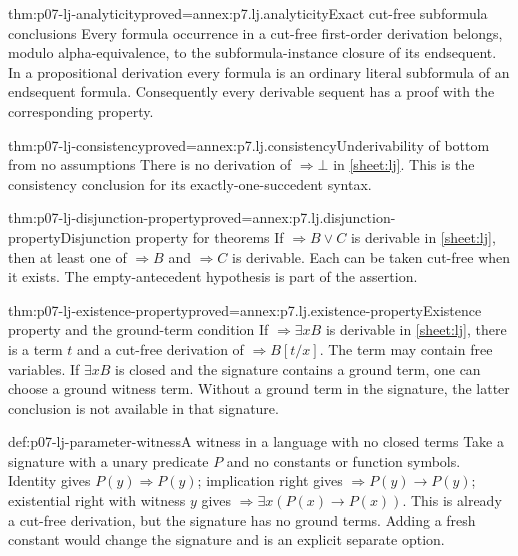 \begin{hbcorollary}{thm:p07-lj-analyticity}{proved=annex:p7.lj.analyticity}{Exact cut-free subformula conclusions}
Every formula occurrence in a cut-free first-order derivation belongs,
modulo alpha-equivalence, to the subformula-instance closure of its
endsequent.  In a propositional derivation every formula is an ordinary
literal subformula of an endsequent formula.  Consequently every
derivable sequent has a proof with the corresponding property.
\end{hbcorollary}

\begin{hbcorollary}{thm:p07-lj-consistency}{proved=annex:p7.lj.consistency}{Underivability of bottom from no assumptions}
There is no derivation of \(\Rightarrow\bot\) in \ref{sheet:lj}.
This is the consistency conclusion for its exactly-one-succedent syntax.
\end{hbcorollary}

\begin{hbcorollary}{thm:p07-lj-disjunction-property}{proved=annex:p7.lj.disjunction-property}{Disjunction property for theorems}
If \(\Rightarrow B\lor C\) is derivable in \ref{sheet:lj}, then at
least one of \(\Rightarrow B\) and \(\Rightarrow C\) is derivable.
Each can be taken cut-free when it exists.  The empty-antecedent
hypothesis is part of the assertion.
\end{hbcorollary}

\begin{hbcorollary}{thm:p07-lj-existence-property}{proved=annex:p7.lj.existence-property}{Existence property and the ground-term condition}
If \(\Rightarrow\exists xB\) is derivable in \ref{sheet:lj}, there is
a term \(t\) and a cut-free derivation of
\(\Rightarrow B[t/x]\).  The term may contain free variables.
If \(\exists xB\) is closed and the signature contains a ground term,
one can choose a ground witness term.  Without a ground term in the
signature, the latter conclusion is not available in that signature.
\end{hbcorollary}

\begin{hbexample}{def:p07-lj-parameter-witness}{A witness in a language with no closed terms}
Take a signature with a unary predicate \(P\) and no constants or
function symbols.  Identity gives \(P(y)\Rightarrow P(y)\);
implication right gives \(\Rightarrow P(y)\to P(y)\); existential
right with witness \(y\) gives
\(\Rightarrow\exists x(P(x)\to P(x))\).  This is already a cut-free
derivation, but the signature has no ground terms.  Adding a fresh
constant would change the signature and is an explicit separate option.
\end{hbexample}

